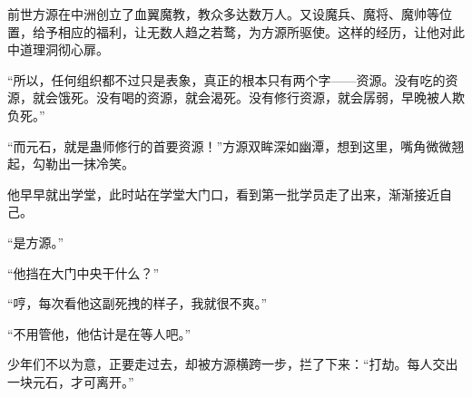\begin{this_body}
前世方源在中洲创立了血翼魔教，教众多达数万人。又设魔兵、魔将、魔帅等位置，给予相应的福利，让无数人趋之若鹜，为方源所驱使。这样的经历，让他对此中道理洞彻心扉。

“所以，任何组织都不过只是表象，真正的根本只有两个字——资源。没有吃的资源，就会饿死。没有喝的资源，就会渴死。没有修行资源，就会孱弱，早晚被人欺负死。”

“而元石，就是蛊师修行的首要资源！”方源双眸深如幽潭，想到这里，嘴角微微翘起，勾勒出一抹冷笑。

他早早就出学堂，此时站在学堂大门口，看到第一批学员走了出来，渐渐接近自己。

“是方源。”

“他挡在大门中央干什么？”

“哼，每次看他这副死拽的样子，我就很不爽。”

“不用管他，他估计是在等人吧。”

少年们不以为意，正要走过去，却被方源横跨一步，拦了下来：“打劫。每人交出一块元石，才可离开。”

\end{this_body}

